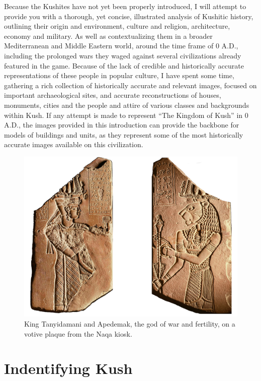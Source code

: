 \documentclass[a4paper,12pt]{scrreprt}
\begin{document}
Because the Kushites have not yet been properly introduced, I will attempt to provide you with a thorough, yet concise, illustrated analysis of Kushitic history, outlining their origin and environment, culture and religion, architecture, economy and military. As well as contextualizing them in a broader Mediterranean and Middle Eastern world, around the time frame of 0 A.D., including the prolonged wars they waged against several civilizations already featured in the game. Because of the lack of credible and historically accurate representations of these people in popular culture, I have spent some time, gathering a rich collection of historically accurate and relevant images, focused on important archaeological sites, and accurate reconstructions of houses, monuments, cities and the people and attire of various classes and backgrounds within Kush. If any attempt is made to represent “The Kingdom of Kush” in 0 A.D., the images provided in this introduction can provide the backbone for models of buildings and units, as they represent some of the most historically accurate images available on this civilization.

\begin{figure}[H]
	\centering
	\includegraphics[width=\textwidth]{img/king_tanyidamani_and_apedemak}
	\caption{King Tanyidamani and Apedemak, the god of war and fertility, on a votive plaque from the Naqa kiosk.}
\end{figure}

\section{Indentifying Kush}
\end{document}
